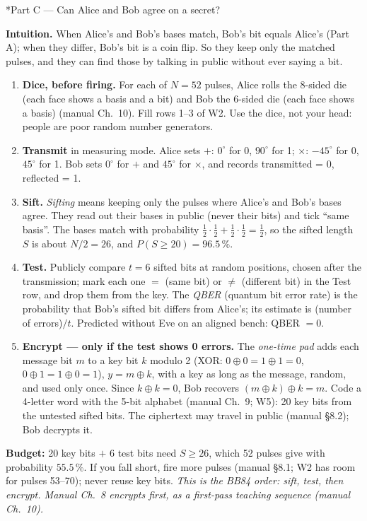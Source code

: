 \documentclass[a4paper,11pt]{article}
\makeatletter
\renewcommand\section{\@startsection{section}{1}{\z@}{-1.6ex \@plus -.5ex}{0.6ex}{\normalfont\large\bfseries\color{ibmblue}}}
\newenvironment{steps}{\begin{enumerate}\setlength{\itemsep}{1pt}\setlength{\parsep}{0pt}\setlength{\topsep}{2pt}}{\end{enumerate}}
\makeatother
\begin{document}
\section*{Part C --- Can Alice and Bob agree on a secret?}

\textbf{Intuition.} When Alice's and Bob's bases match, Bob's bit equals Alice's (Part
A); when they differ, Bob's bit is a coin flip. So they keep only the matched pulses,
and they can find those by talking in public without ever saying a bit.
\begin{steps}
  \item \textbf{Dice, before firing.} For each of $N = 52$ pulses, Alice rolls the
        8-sided die (each face shows a basis and a bit) and Bob the 6-sided die (each
        face shows a basis) (manual Ch.~10). Fill rows 1--3 of W2. Use the dice, not
        your head: people are poor random number generators.
  \item \textbf{Transmit} in measuring mode. Alice sets $+$: $0^\circ$ for 0,
        $90^\circ$ for 1; $\times$: $-45^\circ$ for 0, $45^\circ$ for 1. Bob sets
        $0^\circ$ for $+$ and $45^\circ$ for $\times$, and records transmitted = 0,
        reflected = 1.
  \item \textbf{Sift.} \emph{Sifting} means keeping only the pulses where Alice's and
        Bob's bases agree. They read out their bases in public (never their bits) and
        tick ``same basis''. The bases match with probability
        $\tfrac12\cdot\tfrac12 + \tfrac12\cdot\tfrac12 = \tfrac12$, so the sifted length
        $S$ is about $N/2 = 26$, and $P(S \ge 20) = 96.5\,\%$.
  \item \textbf{Test.} Publicly compare $t = 6$ sifted bits at random positions, chosen
        after the transmission; mark each one $=$ (same bit) or $\neq$ (different bit) in
        the Test row, and drop them from the key. The \emph{QBER} (quantum bit error rate) is
        the probability that Bob's sifted bit differs from Alice's; its estimate is
        (number of errors)$/t$. Predicted without Eve on an aligned bench: QBER $= 0$.
  \item \textbf{Encrypt --- only if the test shows 0 errors.} The \emph{one-time pad}
        adds each message bit $m$ to a key bit $k$ modulo 2 (XOR:
        $0\oplus0 = 1\oplus1 = 0$, $0\oplus1 = 1\oplus0 = 1$), $y = m \oplus k$, with a
        key as long as the message, random, and used only once. Since $k \oplus k = 0$,
        Bob recovers $(m\oplus k)\oplus k = m$. Code a 4-letter word with the 5-bit
        alphabet (manual Ch.~9; W5): 20 key bits from the untested sifted bits. The
        ciphertext may travel in public (manual \S8.2); Bob decrypts it.
\end{steps}
\textbf{Budget:} 20 key bits $+$ 6 test bits need $S \ge 26$, which 52 pulses give with
probability $55.5\,\%$. If you fall short, fire more pulses (manual \S8.1; W2 has room for pulses 53--70); never reuse
key bits. \emph{This is the BB84 order: sift, test, then encrypt. Manual Ch.~8 encrypts
first, as a first-pass teaching sequence (manual Ch.~10).}
\end{document}
